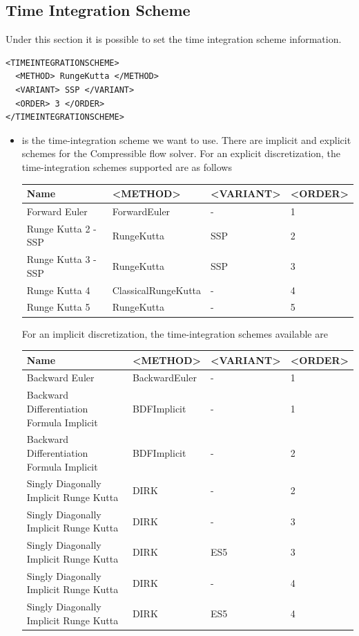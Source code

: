 \subsection*{Time Integration Scheme}
Under this section it is possible to set the time integration scheme
information.
\begin{lstlisting}[style=XmlStyle]
<TIMEINTEGRATIONSCHEME>
  <METHOD> RungeKutta </METHOD>
  <VARIANT> SSP </VARIANT>
  <ORDER> 3 </ORDER>
</TIMEINTEGRATIONSCHEME>
\end{lstlisting}
\begin{itemize}
\item {} is the time-integration scheme we want to use. 
There are implicit and explicit schemes for the Compressible flow solver. 
For an explicit discretization, the time-integration schemes supported are as follows
\begin{center}
  \begin{tabular}{l|l|l|l}
  \toprule
  Name & <METHOD> & <VARIANT> & <ORDER> \\
  \midrule
  Forward Euler & ForwardEuler & - & 1 \\
  Runge Kutta 2 - SSP & RungeKutta & SSP & 2 \\
  Runge Kutta 3 - SSP & RungeKutta & SSP & 3 \\
  Runge Kutta 4 & ClassicalRungeKutta & - & 4 \\
  Runge Kutta 5 & RungeKutta & - & 5 \\
  \bottomrule
  \end{tabular}
\end{center}
For an implicit discretization, the time-integration schemes available are
\begin{center}
  \begin{tabular}{l|l|l|l}
  \toprule
  Name & <METHOD> & <VARIANT> & <ORDER> \\
  \midrule
  Backward Euler & BackwardEuler & - & 1 \\
  Backward Differentiation Formula Implicit & BDFImplicit & - & 1 \\
  Backward Differentiation Formula Implicit & BDFImplicit & - & 2 \\
  Singly Diagonally Implicit Runge Kutta & DIRK & - & 2 \\
  Singly Diagonally Implicit Runge Kutta & DIRK & - & 3 \\
  Singly Diagonally Implicit Runge Kutta & DIRK & ES5 & 3 \\
  Singly Diagonally Implicit Runge Kutta & DIRK & - & 4 \\
  Singly Diagonally Implicit Runge Kutta & DIRK & ES5 & 4 \\
  \bottomrule
  \end{tabular}
\end{center}
\end{itemize}

